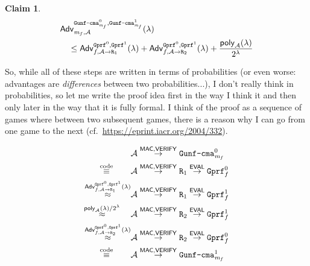 \documentclass[a4paper,table,dvipsnames]{article}
\theoremstyle{definition}
\newtheorem{claim}{Claim}
\newcommand{\M}[1]{\ensuremath{\text{\texttt{#1}}}}
\renewcommand{\O}[1]{\ensuremath{\mathsf{#1}}}
\newcommand{\pcvar}[1]{\ensuremath{\mathit{#1}}}
\newcommand{\m}{\pcvar{m}} %
\begin{document}
\begin{claim}\label{greatclaim}
\begin{align*}
   &\mathsf{Adv}^{\M{Gunf\text{-}cma}_{\m_f}^0,\M{Gunf\text{-}cma}_{\m_f}^1}_{\m_f,\adv}(\lambda)\\
   &\quad\leq\mathsf{Adv}^{\M{Gprf}^0,\M{Gprf}^1}_{f,\adv\rightarrow\M{R}_1}(\lambda)
   +\mathsf{Adv}^{\M{Gprf}^0,\M{Gprf}^1}_{f,\adv\rightarrow\M{R}_2}(\lambda)
   +\frac{\O{poly}_{\adv}(\lambda)}{2^\lambda}
\end{align*}
	
\end{claim}
So, while all of these steps are written in terms of probabilities (or even worse: advantages are \emph{differences}
between two probabilities...), I don't really think in probabilities,
so let me write the proof idea first in the way I think it and then only later in the way that it is fully formal.
I think of the proof as a sequence of games where between two
subsequent games, there is a reason why I can go from one game to the next (cf.~\url{https://eprint.iacr.org/2004/332}).


\begin{align*}
   &\adv\stackrel{\O{MAC},\O{VERIFY}}{\rightarrow}\M{Gunf\text{-}cma}_{\m_f}^0\\
   \stackrel{\text{code}}{\equiv}\;\;\;\;\;\;\;\,&\adv\stackrel{\O{MAC},\O{VERIFY}}{\rightarrow}\M{R}_1\stackrel{\O{EVAL}}{\rightarrow}\M{Gprf}^0_f\\
\stackrel{\mathsf{Adv}^{\M{Gprf}^0,\M{Gprf}^1}_{f,\adv\rightarrow\M{R}_1}(\lambda)}{\approx} &\adv\stackrel{\O{MAC},\O{VERIFY}}{\rightarrow}\M{R}_1\stackrel{\O{EVAL}}{\rightarrow}\M{Gprf}^1_f\\
\stackrel{\O{poly}_\adv(\lambda)/2^\lambda}{\approx}\;\;\;\;\,
   &\adv\stackrel{\O{MAC},\O{VERIFY}}{\rightarrow}\M{R}_2\stackrel{\O{EVAL}}{\rightarrow}\M{Gprf}^1_f\\
   \stackrel{\mathsf{Adv}^{\M{Gprf}^0,\M{Gprf}^1}_{f,\adv\rightarrow\M{R}_2}(\lambda)}{\approx}&\adv\stackrel{\O{MAC},\O{VERIFY}}{\rightarrow}\M{R}_2\stackrel{\O{EVAL}}{\rightarrow}\M{Gprf}^0_f\\
   \stackrel{\text{code}}{\equiv}\;\;\;\;\;\;\;\,&\adv\stackrel{\O{MAC},\O{VERIFY}}{\rightarrow}\M{Gunf\text{-}cma}_{\m_f}^1
\end{align*}
\end{document}

